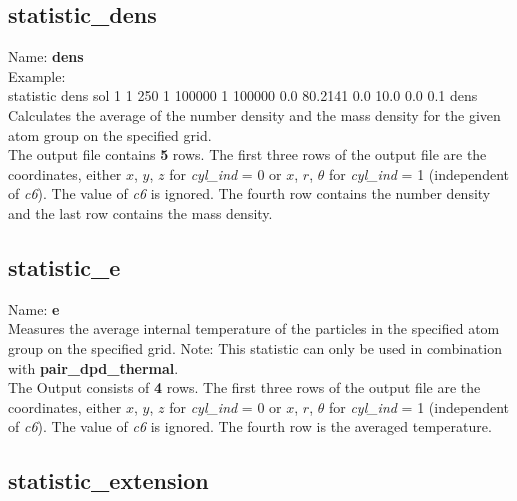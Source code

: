 \subsection{statistic\_dens}

Name: {\bfseries dens}
\\[2ex]
Example:\\[0.5ex]
statistic       dens sol 1 1 250 1 100000 1 100000 0.0 80.2141 0.0 10.0 0.0 0.1 dens
\\[2ex]
Calculates the average of the number density and the mass density for the given atom group on the specified grid.
\\[2ex]
The output file contains {\bfseries 5} rows.
The first three rows of the output file are the coordinates, either $x$, $y$, $z$ for \textit{cyl\_ind} = 0 or $x$, $r$, $\theta$ for \textit{cyl\_ind} = 1 (independent of \textit{c6}).
The value of \textit{c6} is ignored.
The fourth row contains the number density and the last row contains the mass density.


\subsection{statistic\_e}

Name: {\bfseries e}
\\[2ex]
Measures the average internal temperature of the particles in the specified atom group on the specified grid.
Note: This statistic can only be used in combination with \textbf{pair\_dpd\_thermal}.
\\[2ex]
The Output consists of {\bfseries 4} rows.
The first three rows of the output file are the coordinates, either $x$, $y$, $z$ for \textit{cyl\_ind} = 0 or $x$, $r$, $\theta$ for \textit{cyl\_ind} = 1 (independent of \textit{c6}).
The value of \textit{c6} is ignored.
The fourth row is the averaged temperature. 


\subsection{statistic\_extension}

